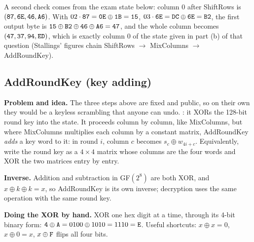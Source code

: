 A second check comes from the exam state below: column 0 after ShiftRows is $(\texttt{87}, \texttt{6E}, \texttt{46}, \texttt{A6})$. With $02 \cdot \texttt{87} = \texttt{0E} \oplus \texttt{1B} = \texttt{15}$, $03 \cdot \texttt{6E} = \texttt{DC} \oplus \texttt{6E} = \texttt{B2}$, the first output byte is $\texttt{15} \oplus \texttt{B2} \oplus \texttt{46} \oplus \texttt{A6} = \texttt{47}$, and the whole column becomes $(\texttt{47}, \texttt{37}, \texttt{94}, \texttt{ED})$, which is exactly column 0 of the state given in part (b) of that question (Stallings' figures chain ShiftRows $\to$ MixColumns $\to$ AddRoundKey).

\subsection{AddRoundKey (key adding) \hot}

\textbf{Problem and idea.} The three steps above are fixed and public, so on their own they would be a keyless scrambling that anyone can undo. : it XORs the 128-bit round key into the state. It proceeds column by column, like MixColumns, but where MixColumns multiplies each column by a constant matrix, AddRoundKey \emph{adds} a key word to it: in round $i$, column $c$ becomes $s_c \oplus w_{4i + c}$. Equivalently, write the round key as a $4 \times 4$ matrix whose columns are the four words and XOR the two matrices entry by entry.

\textbf{Inverse.} Addition and subtraction in GF$(2^8)$ are both XOR, and $x \oplus k \oplus k = x$, so AddRoundKey is its own inverse; decryption uses the same operation with the same round key.

\textbf{Doing the XOR by hand.} XOR one hex digit at a time, through its 4-bit binary form: $\texttt{4} \oplus \texttt{A} = 0100 \oplus 1010 = 1110 = \texttt{E}$. Useful shortcuts: $x \oplus x = 0$, $x \oplus 0 = x$, $x \oplus \texttt{F}$ flips all four bits.

